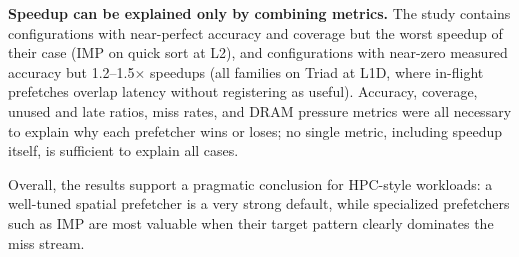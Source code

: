 \documentclass[12pt, letterpaper]{article}
\begin{document}
\noindent\textbf{Speedup can be explained only by combining metrics.} The study contains configurations with near-perfect accuracy and coverage but the worst speedup of their case (IMP on quick sort at L2), and configurations with near-zero measured accuracy but 1.2--1.5$\times$ speedups (all families on Triad at L1D, where in-flight prefetches overlap latency without registering as useful). Accuracy, coverage, unused and late ratios, miss rates, and DRAM pressure metrics were all necessary to explain why each prefetcher wins or loses; no single metric, including speedup itself, is sufficient to explain all cases.

\noindent Overall, the results support a pragmatic conclusion for HPC-style workloads: a well-tuned spatial prefetcher is a very strong default, while specialized prefetchers such as IMP are most valuable when their target pattern clearly dominates the miss stream.

\newpage


\end{document}
